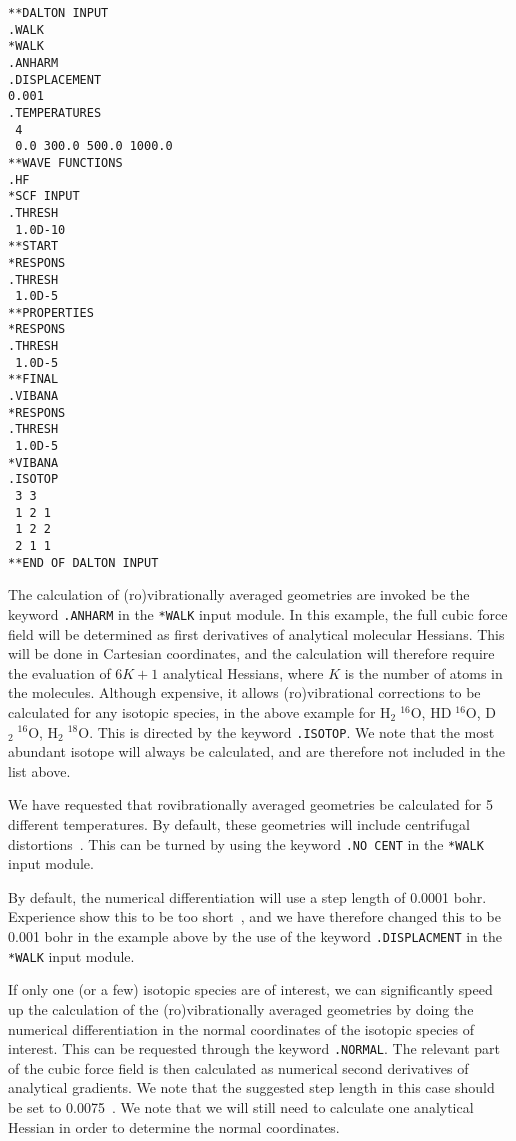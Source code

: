\begin{verbatim}
**DALTON INPUT
.WALK
*WALK
.ANHARM
.DISPLACEMENT
0.001
.TEMPERATURES
 4
 0.0 300.0 500.0 1000.0
**WAVE FUNCTIONS
.HF
*SCF INPUT
.THRESH
 1.0D-10
**START
*RESPONS
.THRESH
 1.0D-5
**PROPERTIES
*RESPONS
.THRESH
 1.0D-5
**FINAL
.VIBANA
*RESPONS
.THRESH
 1.0D-5
*VIBANA
.ISOTOP
 3 3
 1 2 1
 1 2 2
 2 1 1
**END OF DALTON INPUT
\end{verbatim}

The calculation of (ro)vibrationally averaged geometries are invoked
be the keyword \verb|.ANHARM| in the \verb|*WALK| input module. In
this example, the full cubic force field will be determined as 
first derivatives of analytical molecular Hessians. This will be done
in Cartesian coordinates, and the calculation will therefore require
the evaluation of $6K + 1$ analytical Hessians, where $K$ is the
number of atoms in the molecules. Although expensive, it allows
 (ro)vibrational corrections to be calculated for any isotopic
species, in the above 
example for H$_2\;^{16}$O, HD$\;^{16}$O, D$_2\;^{16}$O,
H$_2\;^{18}$O. This is directed by the keyword \verb|.ISOTOP|. We
note that the most abundant isotope will always be calculated, and are
therefore not included in the list above.

We have requested that rovibrationally averaged geometries be
calculated for 5 different temperatures. By default, these geometries
will include centrifugal distortions~\cite{krjljv}. This can be
turned by using the keyword \verb|.NO CENT| in the \verb|*WALK| input
module.

By default, the numerical differentiation will use a step length of
0.0001 bohr. Experience show this to be too short~\cite{poakrprtjcp112}, and we have
therefore changed this to be 0.001 bohr in the example above by the
use of the keyword \verb|.DISPLACMENT| in the \verb|*WALK| input
module.

If only one (or a few) isotopic species are of interest, we can significantly
speed up the calculation of the (ro)vibrationally averaged geometries
by doing the numerical differentiation in the normal coordinates of
the isotopic species of interest. This can be requested through the
keyword \verb|.NORMAL|. The relevant part of the cubic force field is
then calculated as numerical second derivatives of analytical
gradients. We note that the suggested step length in this case should
be set to 0.0075~\cite{poakrprtjcp112}. We note that we will still need to calculate one
analytical Hessian in order to determine the normal coordinates.

